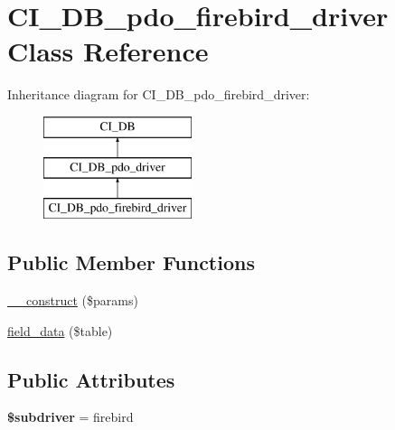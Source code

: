 \hypertarget{class_c_i___d_b__pdo__firebird__driver}{}\section{C\+I\+\_\+\+D\+B\+\_\+pdo\+\_\+firebird\+\_\+driver Class Reference}
\label{class_c_i___d_b__pdo__firebird__driver}
Inheritance diagram for C\+I\+\_\+\+D\+B\+\_\+pdo\+\_\+firebird\+\_\+driver\+:\begin{figure}[H]
\begin{center}
\leavevmode
\includegraphics[height=3.000000cm]{class_c_i___d_b__pdo__firebird__driver}
\end{center}
\end{figure}
\subsection*{Public Member Functions}
\begin{DoxyCompactItemize}
\item 
\mbox{\hyperlink{class_c_i___d_b__pdo__firebird__driver_abf9eb8714534280f3bb4d8b96d219a34}{\+\_\+\+\_\+construct}} (\$params)
\item 
\mbox{\hyperlink{class_c_i___d_b__pdo__firebird__driver_a6ad919f832e5e51527b8ab55e79beca4}{field\+\_\+data}} (\$table)
\end{DoxyCompactItemize}
\subsection*{Public Attributes}
\begin{DoxyCompactItemize}
\item 
\mbox{\label{class_c_i___d_b__pdo__firebird__driver_a96a343fc38f89e90ddc6a9d57620d214}} 
{\bfseries \$subdriver} = \textquotesingle{}firebird\textquotesingle{}
\end{DoxyCompactItemize}
